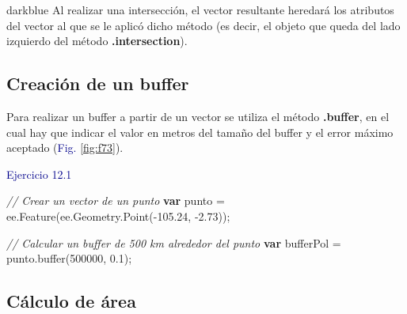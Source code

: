 \documentclass[
  12pt,
  letterpaper,
  twoside]{book}
\newenvironment{Shaded}{\begin{snugshade}}{\end{snugshade}}
\newcommand{\AttributeTok}[1]{\textcolor[rgb]{0.48,0.12,0.64}{#1}}
\newcommand{\CommentTok}[1]{\textcolor[rgb]{0.24,0.58,0.00}{\textit{#1}}}
\newcommand{\DecValTok}[1]{\textcolor[rgb]{0.28,0.53,0.93}{#1}}
\newcommand{\FloatTok}[1]{\textcolor[rgb]{0.28,0.53,0.93}{#1}}
\newcommand{\FunctionTok}[1]{\textcolor[rgb]{0.48,0.12,0.64}{#1}}
\newcommand{\KeywordTok}[1]{\textcolor[rgb]{0.00,0.00,0.00}{\textbf{#1}}}
\newcommand{\NormalTok}[1]{#1}
\newcommand{\OperatorTok}[1]{\textcolor[rgb]{0.00,0.00,0.00}{#1}}
\newcommand\boldpurple[1]{\textcolor{darkpurple}{\textbf{#1}}}
\begin{document}
\begin{bluebox2}

\begin{awesomeblock}{5pt}{\faLightbulb}{darkblue}
Al realizar una intersección, el vector resultante heredará los atributos del vector al que se le aplicó dicho método (es decir, el objeto que queda del lado izquierdo del método \boldpurple{.intersection}).

\end{awesomeblock}

\end{bluebox2}

\hypertarget{creaciuxf3n-de-un-buffer}{%
\subsection*{Creación de un buffer}\label{creaciuxf3n-de-un-buffer}}

Para realizar un buffer a partir de un vector se utiliza el método \boldpurple{.buffer}, en el cual hay que indicar el valor en metros del tamaño del buffer y el error máximo aceptado (\textcolor{darkblue}{Fig.} \ref{fig:f73}).

\textcolor{darkblue}{Ejercicio 12.1}

\begin{Shaded}
\begin{Highlighting}[]
\CommentTok{// Crear un vector de un  punto}
\KeywordTok{var}\NormalTok{ punto }\OperatorTok{=}\NormalTok{ ee}\OperatorTok{.}\FunctionTok{Feature}\NormalTok{(ee}\OperatorTok{.}\AttributeTok{Geometry}\OperatorTok{.}\FunctionTok{Point}\NormalTok{(}\OperatorTok{{-}}\FloatTok{105.24}\OperatorTok{,} \OperatorTok{{-}}\FloatTok{2.73}\NormalTok{))}\OperatorTok{;}

\CommentTok{// Calcular un buffer de 500 km alrededor del punto}
\KeywordTok{var}\NormalTok{ bufferPol }\OperatorTok{=}\NormalTok{ punto}\OperatorTok{.}\FunctionTok{buffer}\NormalTok{(}\DecValTok{500000}\OperatorTok{,} \FloatTok{0.1}\NormalTok{)}\OperatorTok{;}
\end{Highlighting}
\end{Shaded}

\hypertarget{cuxe1lculo-de-uxe1rea}{%
\subsection*{Cálculo de área}\label{cuxe1lculo-de-uxe1rea}}
\end{document}
